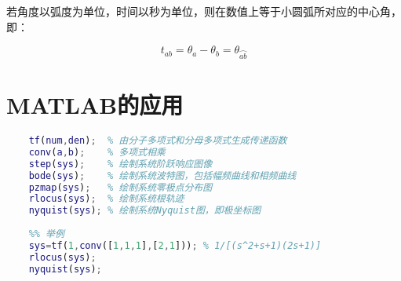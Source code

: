 \documentclass[cn, blue, normal, 12pt]{elegantnote}
\begin{document}
若角度以弧度为单位，时间以秒为单位，则在数值上等于小圆弧所对应的中心角，即：

\begin{equation}
    t_{ab}=\theta_a-\theta_b=\theta_{\wideparen{ab}}
\end{equation}

\section{MATLAB的应用}

\begin{lstlisting}[language=Matlab]
    %% 需要掌握的函数
    tf(num,den);  % 由分子多项式和分母多项式生成传递函数
    conv(a,b);    % 多项式相乘
    step(sys);    % 绘制系统阶跃响应图像
    bode(sys);    % 绘制系统波特图，包括幅频曲线和相频曲线
    pzmap(sys);   % 绘制系统零极点分布图
    rlocus(sys);  % 绘制系统根轨迹
    nyquist(sys); % 绘制系统Nyquist图，即极坐标图
    
    %% 举例
    sys=tf(1,conv([1,1,1],[2,1])); % 1/[(s^2+s+1)(2s+1)]
    rlocus(sys);
    nyquist(sys);
\end{lstlisting}
\end{document}
